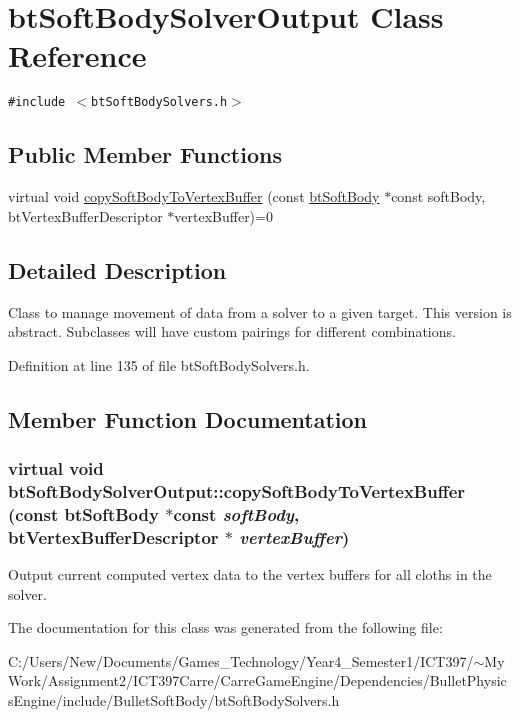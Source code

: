 \hypertarget{classbt_soft_body_solver_output}{
\section{btSoftBodySolverOutput Class Reference}
\label{classbt_soft_body_solver_output}
}
{\tt \#include $<$btSoftBodySolvers.h$>$}

\subsection*{Public Member Functions}
\begin{CompactItemize}
\item 
virtual void \hyperlink{classbt_soft_body_solver_output_7c3761747267f87da347aad276218663}{copySoftBodyToVertexBuffer} (const \hyperlink{classbt_soft_body}{btSoftBody} $\ast$const softBody, btVertexBufferDescriptor $\ast$vertexBuffer)=0
\end{CompactItemize}


\subsection{Detailed Description}
Class to manage movement of data from a solver to a given target. This version is abstract. Subclasses will have custom pairings for different combinations. 

Definition at line 135 of file btSoftBodySolvers.h.

\subsection{Member Function Documentation}
\hypertarget{classbt_soft_body_solver_output_7c3761747267f87da347aad276218663}{
\subsubsection[copySoftBodyToVertexBuffer]{\setlength{\rightskip}{0pt plus 5cm}virtual void btSoftBodySolverOutput::copySoftBodyToVertexBuffer (const {\bf btSoftBody} $\ast$const  {\em softBody}, \/  btVertexBufferDescriptor $\ast$ {\em vertexBuffer})}}
\label{classbt_soft_body_solver_output_7c3761747267f87da347aad276218663}


Output current computed vertex data to the vertex buffers for all cloths in the solver. 

The documentation for this class was generated from the following file:\begin{CompactItemize}
\item 
C:/Users/New/Documents/Games\_\-Technology/Year4\_\-Semester1/ICT397/$\sim$My Work/Assignment2/ICT397Carre/CarreGameEngine/Dependencies/BulletPhysicsEngine/include/BulletSoftBody/btSoftBodySolvers.h\end{CompactItemize}
